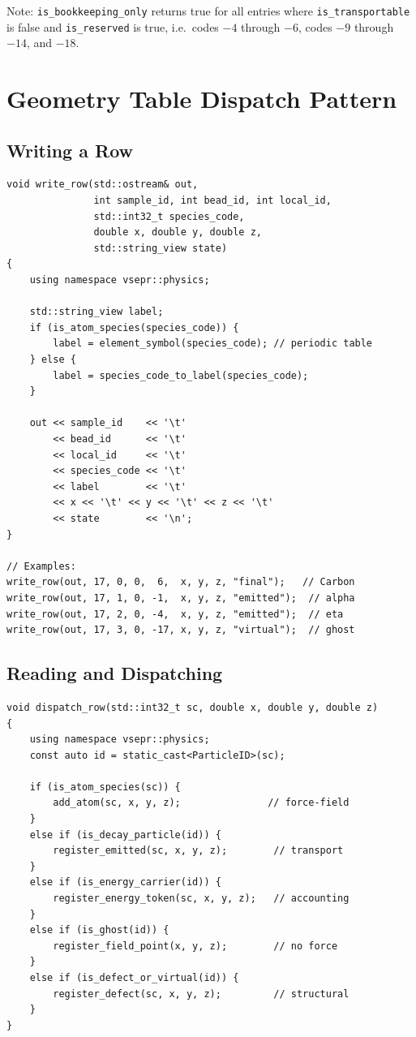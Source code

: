 \documentclass[11pt,a4paper]{article}
\begin{document}
Note: \texttt{is\_bookkeeping\_only} returns true for all entries where
\texttt{is\_transportable} is false and \texttt{is\_reserved} is true,
i.e.\ codes $-4$ through $-6$, codes $-9$ through $-14$, and $-18$.

\section{Geometry Table Dispatch Pattern}

\subsection{Writing a Row}

\begin{lstlisting}[style=cpp20,
  caption={Writing a geometry table row for any species code}]
void write_row(std::ostream& out,
               int sample_id, int bead_id, int local_id,
               std::int32_t species_code,
               double x, double y, double z,
               std::string_view state)
{
    using namespace vsepr::physics;

    std::string_view label;
    if (is_atom_species(species_code)) {
        label = element_symbol(species_code); // periodic table
    } else {
        label = species_code_to_label(species_code);
    }

    out << sample_id    << '\t'
        << bead_id      << '\t'
        << local_id     << '\t'
        << species_code << '\t'
        << label        << '\t'
        << x << '\t' << y << '\t' << z << '\t'
        << state        << '\n';
}

// Examples:
write_row(out, 17, 0, 0,  6,  x, y, z, "final");   // Carbon
write_row(out, 17, 1, 0, -1,  x, y, z, "emitted");  // alpha
write_row(out, 17, 2, 0, -4,  x, y, z, "emitted");  // eta
write_row(out, 17, 3, 0, -17, x, y, z, "virtual");  // ghost
\end{lstlisting}

\subsection{Reading and Dispatching}

\begin{lstlisting}[style=cpp20,
  caption={Dispatch on species\_code while reading geometry table}]
void dispatch_row(std::int32_t sc, double x, double y, double z)
{
    using namespace vsepr::physics;
    const auto id = static_cast<ParticleID>(sc);

    if (is_atom_species(sc)) {
        add_atom(sc, x, y, z);               // force-field
    }
    else if (is_decay_particle(id)) {
        register_emitted(sc, x, y, z);        // transport
    }
    else if (is_energy_carrier(id)) {
        register_energy_token(sc, x, y, z);   // accounting
    }
    else if (is_ghost(id)) {
        register_field_point(x, y, z);        // no force
    }
    else if (is_defect_or_virtual(id)) {
        register_defect(sc, x, y, z);         // structural
    }
}
\end{lstlisting}
\end{document}
